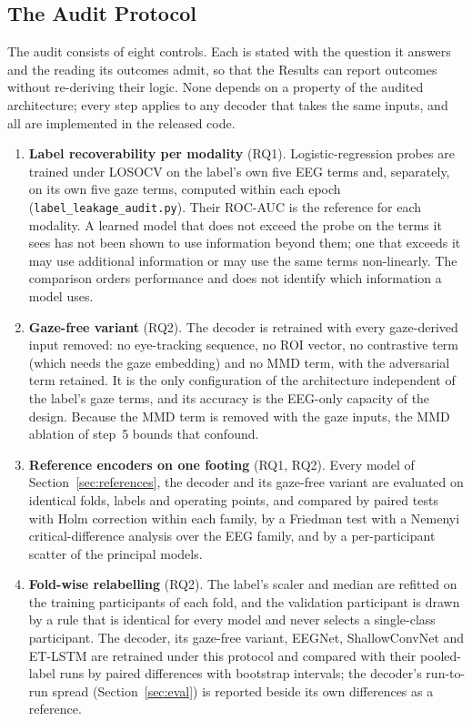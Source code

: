 \documentclass[pdflatex,sn-basic,Numbered,twocolumn,iicol]{sn-jnl}
\theoremstyle{thmstyleone}%
\theoremstyle{thmstyletwo}%
\theoremstyle{thmstylethree}%
\begin{document}
\subsection{The Audit Protocol}\label{sec:audit}

The audit consists of eight controls. Each is stated with the question it answers and the reading its outcomes admit, so that the Results can report outcomes without re-deriving their logic. None depends on a property of the audited architecture; every step applies to any decoder that takes the same inputs, and all are implemented in the released code.

\begin{enumerate}
\item \textbf{Label recoverability per modality} (RQ1). Logistic-regression probes are trained under LOSOCV on the label's own five EEG terms and, separately, on its own five gaze terms, computed within each epoch (\texttt{label\_leakage\_audit.py}). Their ROC-AUC is the reference for each modality. A learned model that does not exceed the probe on the terms it sees has not been shown to use information beyond them; one that exceeds it may use additional information or may use the same terms non-linearly. The comparison orders performance and does not identify which information a model uses.
\item \textbf{Gaze-free variant} (RQ2). The decoder is retrained with every gaze-derived input removed: no eye-tracking sequence, no ROI vector, no contrastive term (which needs the gaze embedding) and no MMD term, with the adversarial term retained. It is the only configuration of the architecture independent of the label's gaze terms, and its accuracy is the EEG-only capacity of the design. Because the MMD term is removed with the gaze inputs, the MMD ablation of step~5 bounds that confound.
\item \textbf{Reference encoders on one footing} (RQ1, RQ2). Every model of Section~\ref{sec:references}, the decoder and its gaze-free variant are evaluated on identical folds, labels and operating points, and compared by paired tests with Holm correction within each family, by a Friedman test with a Nemenyi critical-difference analysis over the EEG family, and by a per-participant scatter of the principal models.
\item \textbf{Fold-wise relabelling} (RQ2). The label's scaler and median are refitted on the training participants of each fold, and the validation participant is drawn by a rule that is identical for every model and never selects a single-class participant. The decoder, its gaze-free variant, EEGNet, ShallowConvNet and ET-LSTM are retrained under this protocol and compared with their pooled-label runs by paired differences with bootstrap intervals; the decoder's run-to-run spread (Section~\ref{sec:eval}) is reported beside its own differences as a reference.

\end{enumerate}
\end{document}
